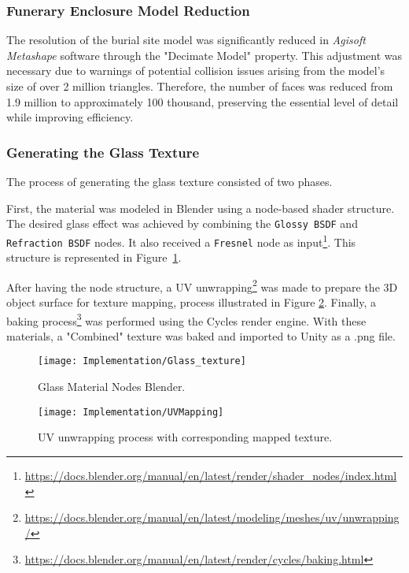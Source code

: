 \subsubsection{Funerary Enclosure Model Reduction}
The resolution of the burial site model was significantly reduced in \emph{Agisoft Metashape} software through the "Decimate Model" property.
This adjustment was necessary due to warnings of potential collision issues arising from the model's size of over 2 million triangles. 
Therefore, the number of faces was reduced from 1.9 million to approximately 100 thousand, preserving the essential level of detail while improving efficiency.

\subsubsection{Generating the Glass Texture}
\label{sec:glass_texture}
The process of generating the glass texture consisted of two phases.  

First, the material was modeled in Blender using a node-based shader structure. The desired glass effect was achieved by combining the \texttt{Glossy BSDF} and \texttt{Refraction BSDF} nodes. It also received a \texttt{Fresnel} node as input\footnote{\url{https://docs.blender.org/manual/en/latest/render/shader_nodes/index.html}}. This structure is represented in Figure~\ref{fig:glass_texture}.  

After having the node structure, a UV unwrapping\footnote {\url{https://docs.blender.org/manual/en/latest/modeling/meshes/uv/unwrapping/}} was made to prepare the \gls{3D} object surface for texture mapping, process illustrated in Figure \ref{fig:uv_process}.
 Finally, a baking process\footnote{\url{https://docs.blender.org/manual/en/latest/render/cycles/baking.html}} was performed using the Cycles render engine.
With these materials, a "Combined" texture was baked and imported to Unity as a .png file.

 \begin{figure}[h!]
    \centering
    \texttt{[image: Implementation/Glass\_texture]}
    \caption{Glass Material Nodes Blender.}
    \label{fig:glass_texture}    
\end{figure}


\begin{figure}[h!]
    \centering
    \texttt{[image: Implementation/UVMapping]}
    \caption{UV unwrapping process with corresponding mapped texture.}
    \label{fig:uv_process}
\end{figure}


